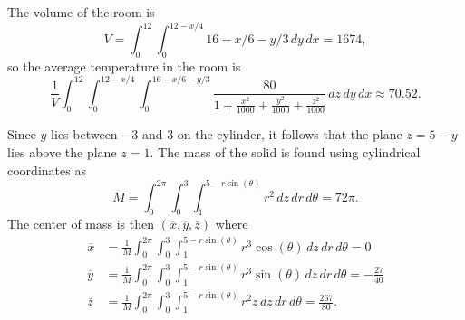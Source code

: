 \begin{exercises}
\begin{exerciseSolution}
	\item The volume of the room is 
\[V=\int_0^{12} \int_0^{12-x/4} 16-x/6-y/3 \, dy  \, dx = 1674,\]
so the average temperature in the room is 
\[\frac{1}{V} \int_0^{12} \int_0^{12-x/4} \int_0^{16-x/6-y/3} \frac{80}{1 + \frac{x^2}{1000} + \frac{y^2}{1000} + \frac{z^2}{1000}} \, dz \, dy \, dx \approx 70.52.\]


	\item Since $y$ lies between $-3$ and $3$ on the cylinder, it follows that the plane $z = 5-y$ lies above the plane $z=1$. The mass of the solid is found using cylindrical coordinates as 
\[M = \int_0^{2\pi} \int_0^3 \int_1^{5-r\sin(\theta)} r^2 \, dz \, dr \, d\theta = 72 \pi.\]
The center of mass is then $(\overline{x}, \overline{y}, \overline{z})$ where 
\begin{align*}
\overline{x} &= \frac{1}{M} \int_0^{2\pi} \int_0^3 \int_1^{5-r\sin(\theta)} r^3\cos(\theta) \, dz \, dr \, d\theta = 0 \\
\overline{y} &= \frac{1}{M} \int_0^{2\pi} \int_0^3 \int_1^{5-r\sin(\theta)} r^3\sin(\theta) \, dz \, dr \, d\theta = -\frac{27}{40} \\
\overline{z} &= \frac{1}{M} \int_0^{2\pi} \int_0^3 \int_1^{5-r\sin(\theta)} r^2z \, dz \, dr \, d\theta = \frac{267}{80}.
\end{align*}


\ea
\end{exerciseSolution}

\end{exercises}
\afterexercises
